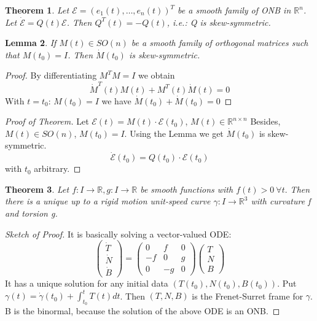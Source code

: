 \documentclass[a4paper,11pt,notitlepage,fullpage]{paper}
\newcommand{\dy}{\dot\gamma}
\theoremstyle{plain}
\newtheorem{thm}{Theorem}[section] %
\newtheorem{lem}[thm]{Lemma}
\theoremstyle{definition}
\begin{document}
\begin{thm}
Let $\mathcal E=(e_1(t), \hdots, e_n(t))^T$ be a smooth family of ONB in $\mathbb R^n$. Let $\dot {\mathcal E} = Q(t) \mathcal E$.
Then $Q^T(t) = -Q(t)$, i.e.: Q is skew-symmetric.

\end{thm}

\begin{lem}
If $M(t) \in SO(n)$ be a smooth family of orthogonal matrices such that $M(t_0) = I$. Then $\dot M(t_0)$ is skew-symmetric.
\end{lem}

\begin{proof}
	By differentiating $M^TM = I$ we obtain
	\[\dot M^T(t) M(t) + M^T(t) \dot M(t) = 0 \]
	With $t = t_0$: $M(t_0) = I$ we have $\dot M(t_0) + \dot M(t_0) = 0$
\end{proof}

\begin{proof}[Proof of Theorem]
Let $\mathcal E(t) = M(t)\cdot\mathcal E(t_0)$, $M(t) \in \mathbb R^{n\times n}$
Besides, $M(t) \in SO(n)$, $M(t_0) = I$.
Using the Lemma we get $\dot M(t_0)$ is skew-symmetric.
\[\dot{\mathcal E}(t_0) = Q(t_0) \cdot \mathcal E(t_0)\]
with $t_0$ arbitrary.
\end{proof}


\begin{thm}
Let $f: I\to \mathbb R, g: I \to \mathbb R$ be smooth functions with $f(t) > 0 ~\forall t.$ Then there is a unique up to a rigid motion unit-speed curve $\gamma: I \to \mathbb R^3$ with curvature f and torsion g.
\end{thm}

\begin{proof}[Sketch of Proof]
It is basically solving a vector-valued ODE:
\begin{equation*}
\begin{pmatrix}
\dot T\\
\dot N\\
\dot B
\end{pmatrix}
=
\begin{pmatrix}
0 & f & 0 \\
-f & 0 & g \\
0 & -g & 0
\end{pmatrix}
\begin{pmatrix}
T \\N\\ B
\end{pmatrix}
\end{equation*}
It has a unique solution for any initial data $(T(t_0), N(t_0), B(t_0))$. Put $\gamma(t) = \dy(t_0) + \int_{t_0}^t T(t) dt$. Then $(T, N, B)$ is the Frenet-Surret frame for $\gamma$. B is the binormal, because the solution of the above ODE is an ONB.
\end{proof}
\end{document}
